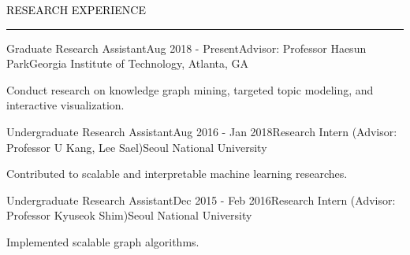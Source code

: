 \documentclass{resume} %
\renewenvironment{rSection}[1]{
	\sectionskip
	\textcolor{Black}{\MakeUppercase{#1}}
	\sectionlineskip
	\hrule
	\begin{list}{}{
			\setlength{\leftmargin}{1.5em}
		}
		\item[]
	}{
	\end{list}
}
\begin{document}
\vspace*{-1.0mm}
\begin{rSection}{Research Experience}
\begin{rSubsection}{Graduate Research Assistant}{Aug 2018 - Present}{Advisor: Professor Haesun Park}{Georgia Institute of Technology, Atlanta, GA}
	\item Conduct research on knowledge graph mining, targeted topic modeling, and interactive visualization.
\end{rSubsection}	
\vspace*{-2.5mm}
\begin{rSubsection}{Undergraduate Research Assistant}{Aug 2016 - Jan 2018}{Research Intern (Advisor: Professor U Kang, Lee Sael)}{Seoul National University}
	\item Contributed to scalable and interpretable machine learning researches.
\end{rSubsection}	
\vspace*{-2.5mm}
\begin{rSubsection}{Undergraduate Research Assistant}{Dec 2015 - Feb 2016}{Research Intern (Advisor: Professor Kyuseok Shim)}{Seoul National University}
	\item Implemented scalable graph algorithms.
\end{rSubsection}

\end{rSection}
\vspace{-3mm}

\end{document}
